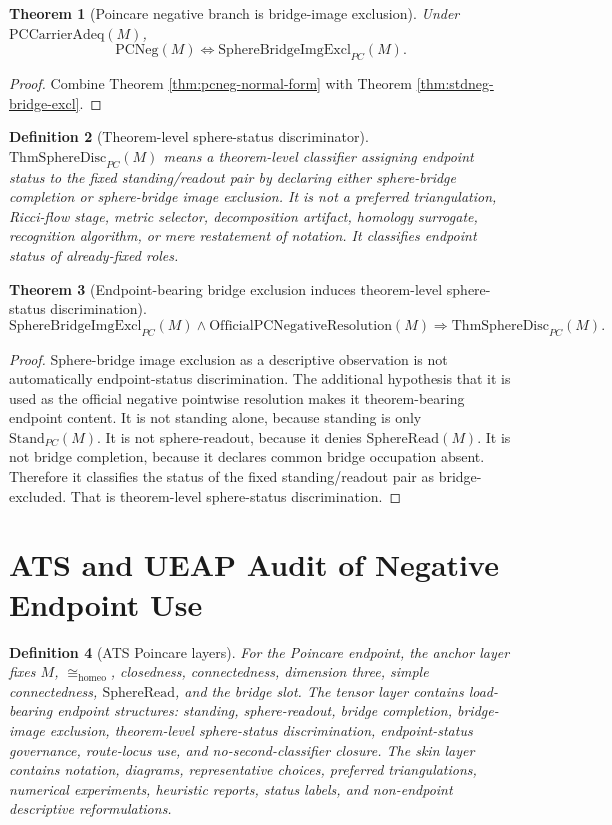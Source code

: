 \documentclass[11pt]{article}
\newtheorem{theorem}{Theorem}[section]
\newtheorem{definition}[theorem]{Definition}
\newcommand{\StandPC}{\mathrm{Stand}_{PC}}
\newcommand{\SphereRead}{\mathrm{SphereRead}}
\newcommand{\OfficialPCNegativeResolution}{\mathrm{OfficialPCNegativeResolution}}
\newcommand{\PCNeg}{\mathrm{PCNeg}}
\newcommand{\SphereBridgeImgExcl}{\mathrm{SphereBridgeImgExcl}_{PC}}
\newcommand{\ThmSphereDisc}{\mathrm{ThmSphereDisc}_{PC}}
\newcommand{\Homeo}{\cong_{\mathrm{homeo}}}
\begin{document}
\begin{theorem}[Poincare negative branch is bridge-image exclusion]\label{thm:pcneg-bridge-excl}
Under \(\mathrm{PCCarrierAdeq}(M)\),
\[
\PCNeg(M)\Longleftrightarrow \SphereBridgeImgExcl(M).
\]
\end{theorem}
\begin{proof}
Combine Theorem \ref{thm:pcneg-normal-form} with Theorem \ref{thm:stdneg-bridge-excl}.
\end{proof}

\begin{definition}[Theorem-level sphere-status discriminator]
\(\ThmSphereDisc(M)\) means a theorem-level classifier assigning endpoint status to the fixed standing/readout pair by declaring either sphere-bridge completion or sphere-bridge image exclusion. It is not a preferred triangulation, Ricci-flow stage, metric selector, decomposition artifact, homology surrogate, recognition algorithm, or mere restatement of notation. It classifies endpoint status of already-fixed roles.
\end{definition}

\begin{theorem}[Endpoint-bearing bridge exclusion induces theorem-level sphere-status discrimination]\label{thm:bridge-excl-disc}
\[
\SphereBridgeImgExcl(M)\wedge\OfficialPCNegativeResolution(M)\Rightarrow \ThmSphereDisc(M).
\]
\end{theorem}
\begin{proof}
Sphere-bridge image exclusion as a descriptive observation is not automatically endpoint-status discrimination. The additional hypothesis that it is used as the official negative pointwise resolution makes it theorem-bearing endpoint content. It is not standing alone, because standing is only \(\StandPC(M)\). It is not sphere-readout, because it denies \(\SphereRead(M)\). It is not bridge completion, because it declares common bridge occupation absent. Therefore it classifies the status of the fixed standing/readout pair as bridge-excluded. That is theorem-level sphere-status discrimination.
\end{proof}

\section{ATS and UEAP Audit of Negative Endpoint Use}\label{sec:ats-ueap-negative}

\begin{definition}[ATS Poincare layers]
For the Poincare endpoint, the anchor layer fixes \(M\), \(\Homeo\), closedness, connectedness, dimension three, simple connectedness, \(\SphereRead\), and the bridge slot. The tensor layer contains load-bearing endpoint structures: standing, sphere-readout, bridge completion, bridge-image exclusion, theorem-level sphere-status discrimination, endpoint-status governance, route-locus use, and no-second-classifier closure. The skin layer contains notation, diagrams, representative choices, preferred triangulations, numerical experiments, heuristic reports, status labels, and non-endpoint descriptive reformulations.
\end{definition}
\end{document}
